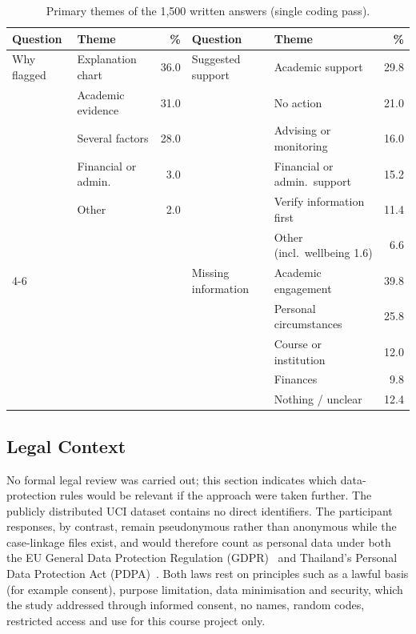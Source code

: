 \begin{table}[H]
\centering
\caption{Primary themes of the 1,500 written answers (single coding pass).}
\label{tab:themes}
\footnotesize
\begin{tabular}{@{}llr@{\hspace{24pt}}llr@{}}
\toprule
\textbf{Question} & \textbf{Theme} & \textbf{\%} & \textbf{Question} & \textbf{Theme} & \textbf{\%} \\
\midrule
Why flagged & Explanation chart & 36.0 & Suggested support & Academic support & 29.8 \\
 & Academic evidence & 31.0 & & No action & 21.0 \\
 & Several factors & 28.0 & & Advising or monitoring & 16.0 \\
 & Financial or admin. & 3.0 & & Financial or admin.\ support & 15.2 \\
 & Other & 2.0 & & Verify information first & 11.4 \\
 & & & & Other (incl.\ wellbeing 1.6) & 6.6 \\
\cmidrule{4-6}
 & & & Missing information & Academic engagement & 39.8 \\
 & & & & Personal circumstances & 25.8 \\
 & & & & Course or institution & 12.0 \\
 & & & & Finances & 9.8 \\
 & & & & Nothing / unclear & 12.4 \\
\bottomrule
\end{tabular}
\end{table}

\subsection{Legal Context}
\label{sec:app-legal}

No formal legal review was carried out; this section indicates which data-protection rules would be
relevant if the approach were taken further. The publicly distributed UCI dataset contains no direct
identifiers. The participant responses, by contrast, remain
pseudonymous rather than anonymous while the case-linkage files exist, and would therefore count as
personal data under both the EU General Data Protection Regulation (GDPR)~\citep{gdpr2016} and
Thailand's Personal Data Protection Act (PDPA)~\citep{pdpa2019}. Both laws rest on principles such as
a lawful basis (for example consent), purpose limitation, data minimisation and security, which the
study addressed through informed consent, no names, random codes, restricted access and use for this
course project only.

